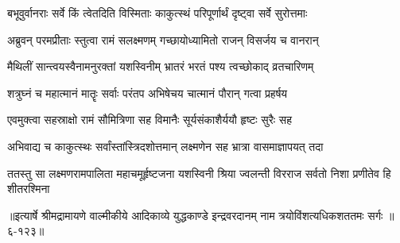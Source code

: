 \twolineshloka
{बभूवुर्वानराः सर्वे किं त्वेतदिति विस्मिताः}
{काकुत्स्थं परिपूर्णार्थं दृष्ट्वा सर्वे सुरोत्तमाः} %

\twolineshloka
{अब्रुवन् परमप्रीताः स्तुत्वा रामं सलक्ष्मणम्}
{गच्छायोध्यामितो राजन् विसर्जय च वानरान्} %

\twolineshloka
{मैथिलीं सान्त्वयस्वैनामनुरक्तां यशस्विनीम्}
{भ्रातरं भरतं पश्य त्वच्छोकाद् व्रतचारिणम्} %

\twolineshloka
{शत्रुघ्नं च महात्मानं मातॄः सर्वाः परंतप}
{अभिषेचय चात्मानं पौरान् गत्वा प्रहर्षय} %

\twolineshloka
{एवमुक्त्वा सहस्राक्षो रामं सौमित्रिणा सह}
{विमानैः सूर्यसंकाशैर्ययौ हृष्टः सुरैः सह} %

\twolineshloka
{अभिवाद्य च काकुत्स्थः सर्वांस्तांस्त्रिदशोत्तमान्}
{लक्ष्मणेन सह भ्रात्रा वासमाज्ञापयत् तदा} %

\twolineshloka
{ततस्तु सा लक्ष्मणरामपालिता महाचमूर्हृष्टजना यशस्विनी}
{श्रिया ज्वलन्ती विरराज सर्वतो निशा प्रणीतेव हि शीतरश्मिना} %


॥इत्यार्षे श्रीमद्रामायणे वाल्मीकीये आदिकाव्ये युद्धकाण्डे इन्द्रवरदानम् नाम त्रयोविंशत्यधिकशततमः सर्गः ॥६-१२३॥
